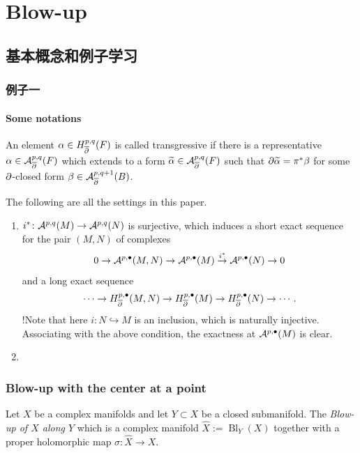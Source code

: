 \chapter{Blow-up}
\section{基本概念和例子学习}
\subsection{例子一}
\subsubsection{Some notations}

\begin{definition}[][transgressive]
    An element $\alpha\in H^{p,q}_{\overline{\partial}}(F)$  is called transgressive if there is a representative $\alpha\in {\mathcal A}^{p,q}_{\overline{\partial}}(F)$ which extends to a form $\widetilde{\alpha}\in {\mathcal A}^{p,q}_{\overline{\partial}}(F)$ such that $\partial\widetilde{\alpha}=\pi^*\beta$ for some $\partial$-closed form $\beta\in {\mathcal A}^{p,q+1}_{\overline{\partial}}(B)$.
\end{definition}

The following are all the settings in this paper.
\begin{enumerate}
    \item $i^*\colon {\mathcal A}^{p,q}(M)\to{\mathcal A}^{p,q}(N)$ is surjective, which induces a short exact sequence for the pair $(M,N)$ of complexes
          \[
              0\to{\mathcal A}^{p,\bullet}(M,N)\to {\mathcal A}^{p,\bullet}(M)\stackrel{i^*}{\to}{\mathcal A}^{p,\bullet}(N)\to 0
          \]
          and a long exact sequence
          \[
              \cdots\to H^{p,\bullet}_{\overline{\partial}} (M,N)\to H^{p,\bullet}_{\overline{\partial}} (M) \to H^{p,\bullet}_{\overline{\partial}} (N)\to \cdots.
          \]
          !Note that here $i\colon N\hookrightarrow M$ is an inclusion, which is naturally injective. Associating with the above condition, the exactness at ${\mathcal A}^{p,\bullet}(M)$ is clear.
    \item
\end{enumerate}

\subsection{Blow-up with the center at a point}

\begin{definition}[][Blow-up]
    Let $X$ be a complex manifolds and let $Y\subset X$ be a closed submanifold. The \textit{Blow-up of $X$ along $Y$} which is a complex manifold $\widehat{X}:=\operatorname{Bl}_Y (X)$ together with a proper holomorphic map $\sigma\colon \widehat{X}\to X$.
\end{definition}


